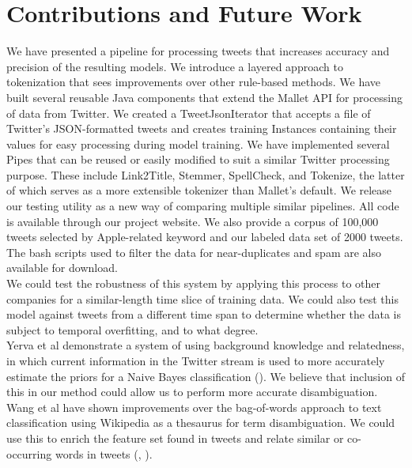 \documentclass[letterpaper]{article}
\begin{document}
\section{Contributions and Future Work}
We have presented a pipeline for processing tweets that increases accuracy and precision of the resulting models. We introduce a layered approach to tokenization that sees improvements over other rule-based methods. We have built several reusable Java components that extend the Mallet API for processing of data from Twitter. We created a TweetJsonIterator that accepts a file of Twitter's JSON-formatted tweets and creates training Instances containing their values for easy processing during model training. We have implemented several Pipes that can be reused or easily modified to suit a similar Twitter processing purpose. These include Link2Title, Stemmer, SpellCheck, and Tokenize, the latter of which serves as a more extensible tokenizer than Mallet's default. We release our testing utility as a new way of comparing multiple similar pipelines. All code is available through our project website. We also provide a corpus of 100,000 tweets selected by Apple-related keyword and our labeled data set of 2000 tweets. The bash scripts used to filter the data for near-duplicates and spam are also available for download.\\

We could test the robustness of this system by applying this process to other companies for a similar-length time slice of training data. We could also test this model against tweets from a different time span to determine whether the data is subject to temporal overfitting, and to what degree.\\

Yerva et al demonstrate a system of using background knowledge and relatedness, in which current information in the Twitter stream is used to more accurately estimate the priors for a Naive Bayes classification (\citeauthor{journals/ijcsa/YervaMA12}). We believe that inclusion of this in our method could allow us to perform more accurate disambiguation.\\

Wang et al have shown improvements over the bag-of-words approach to text classification using Wikipedia as a thesaurus for term disambiguation. We could use this to enrich the feature set found in tweets and relate similar or co-occurring words in tweets (\citeauthor{Wang:2008:UWC:1510528.1511383}, \citeauthor{Wang:2009:UWK:1554488.1554492}).\\
\end{document}

